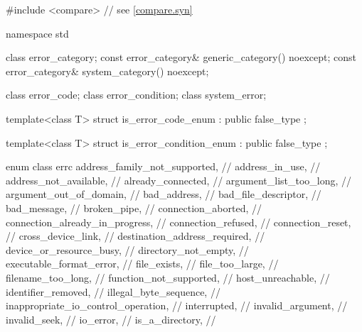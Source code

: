 \begin{codeblock}
#include <compare>              // see \ref{compare.syn}

namespace std {
  class error_category;
  const error_category& generic_category() noexcept;
  const error_category& system_category() noexcept;

  class error_code;
  class error_condition;
  class system_error;

  template<class T>
    struct is_error_code_enum : public false_type {};

  template<class T>
    struct is_error_condition_enum : public false_type {};

  enum class errc {
    address_family_not_supported,       // 
    address_in_use,                     // 
    address_not_available,              // 
    already_connected,                  // 
    argument_list_too_long,             // 
    argument_out_of_domain,             // 
    bad_address,                        // 
    bad_file_descriptor,                // 
    bad_message,                        // 
    broken_pipe,                        // 
    connection_aborted,                 // 
    connection_already_in_progress,     // 
    connection_refused,                 // 
    connection_reset,                   // 
    cross_device_link,                  // 
    destination_address_required,       // 
    device_or_resource_busy,            // 
    directory_not_empty,                // 
    executable_format_error,            // 
    file_exists,                        // 
    file_too_large,                     // 
    filename_too_long,                  // 
    function_not_supported,             // 
    host_unreachable,                   // 
    identifier_removed,                 // 
    illegal_byte_sequence,              // 
    inappropriate_io_control_operation, // 
    interrupted,                        // 
    invalid_argument,                   // 
    invalid_seek,                       // 
    io_error,                           // 
    is_a_directory,                     // 
}}
\end{codeblock}
